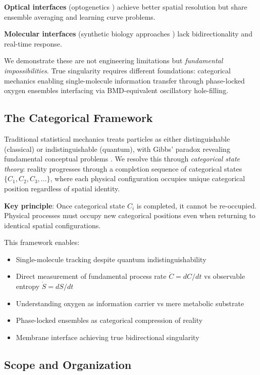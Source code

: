 \documentclass[11pt,a4paper]{article}
\theoremstyle{definition}
\theoremstyle{remark}
\begin{document}
\textbf{Optical interfaces} (optogenetics \cite{Deisseroth2011}) achieve better spatial resolution but share ensemble averaging and learning curve problems.

\textbf{Molecular interfaces} (synthetic biology approaches \cite{Benenson2012}) lack bidirectionality and real-time response.

We demonstrate these are not engineering limitations but \textit{fundamental impossibilities}. True singularity requires different foundations: categorical mechanics enabling single-molecule information transfer through phase-locked oxygen ensembles interfacing via BMD-equivalent oscillatory hole-filling.

\subsection{The Categorical Framework}

Traditional statistical mechanics treats particles as either distinguishable (classical) or indistinguishable (quantum), with Gibbs' paradox revealing fundamental conceptual problems \cite{Gibbs1876,Jaynes1992}. We resolve this through \textit{categorical state theory}: reality progresses through a completion sequence of categorical states $\{C_1, C_2, C_3, ...\}$, where each physical configuration occupies unique categorical position regardless of spatial identity.

\textbf{Key principle}: Once categorical state $C_i$ is completed, it cannot be re-occupied. Physical processes must occupy new categorical positions even when returning to identical spatial configurations.

This framework enables:
\begin{itemize}
\item Single-molecule tracking despite quantum indistinguishability
\item Direct measurement of fundamental process rate $\dot{C} = dC/dt$ vs observable entropy $\dot{S} = dS/dt$
\item Understanding oxygen as information carrier vs mere metabolic substrate
\item Phase-locked ensembles as categorical compression of reality
\item Membrane interface achieving true bidirectional singularity
\end{itemize}

\subsection{Scope and Organization}
\end{document}
